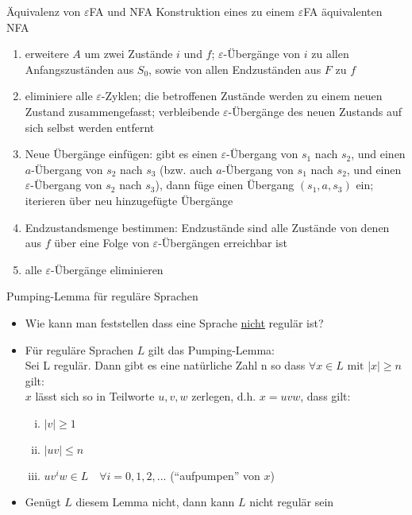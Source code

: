 \begin{frame}{Äquivalenz von $\varepsilon$FA und NFA}
	Konstruktion eines zu einem $\varepsilon$FA äquivalenten NFA
	\begin{enumerate}
		\item erweitere $A$ um zwei Zustände $i$ und $f$; $\varepsilon$-Übergänge von $i$ zu allen Anfangszuständen aus $S_0$, sowie von allen Endzuständen aus $F$ zu $f$
		\item eliminiere alle $\varepsilon$-Zyklen; die betroffenen Zustände werden zu einem neuen Zustand zusammengefasst; verbleibende $\varepsilon$-Übergänge des neuen Zustands auf sich selbst werden entfernt
		\item Neue Übergänge einfügen: gibt es einen $\varepsilon$-Übergang von $s_1$ nach $s_2$, und einen $a$-Übergang von $s_2$ nach $s_3$ (bzw. auch $a$-Übergang von $s_1$ nach $s_2$, und einen $\varepsilon$-Übergang von $s_2$ nach $s_3$), dann füge einen Übergang $(s_1,a,s_3)$ ein; iterieren über neu hinzugefügte Übergänge
		\item Endzustandsmenge bestimmen: Endzustände sind alle Zustände von
		denen aus $f$ über eine Folge von $\varepsilon$-Übergängen erreichbar ist
		\item alle $\varepsilon$-Übergänge eliminieren
	\end{enumerate}
\end{frame}

\begin{frame}{Pumping-Lemma für reguläre Sprachen}
	\begin{itemize}
		\item Wie kann man feststellen dass eine Sprache \underline{nicht} regulär ist?
		\item Für reguläre Sprachen $L$ gilt das Pumping-Lemma:\\
		Sei L regulär. Dann gibt es eine natürliche Zahl n so dass $\forall x \in L \textrm{ mit } |x|\geq n$ gilt:\\
		$x$ lässt sich so in Teilworte $u, v, w$ zerlegen, d.h. $x=uvw$, dass
		gilt:
		\begin{enumerate} [i.]
			\item $|v| \geq 1$
			\item $|uv| \leq n$
			\item $uv^iw \in L\quad \forall i = 0, 1, 2, ...$ ("`aufpumpen"' von $x$)
		\end{enumerate}
		\item Genügt $L$ diesem Lemma nicht, dann kann $L$ nicht regulär sein
	\end{itemize}
\end{frame}

